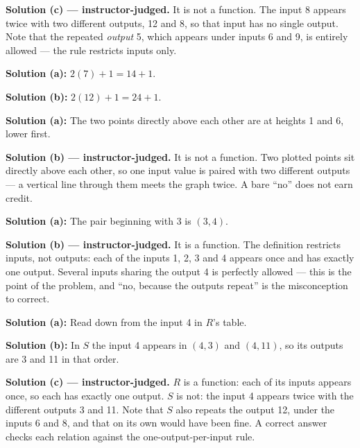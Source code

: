 \documentclass[12pt]{article}
\begin{document}
\textbf{Solution (c) --- instructor-judged.} It is not a function. The input 8
appears twice with two different outputs, 12 and 8, so that input has no
single output. Note that the repeated \emph{output} 5, which appears under
inputs 6 and 9, is entirely allowed --- the rule restricts inputs only.


\textbf{Solution (a):} $2(7) + 1 = 14 + 1$. 

\textbf{Solution (b):} $2(12) + 1 = 24 + 1$. 


\textbf{Solution (a):} The two points directly above each other are at
heights 1 and 6, lower first. 

\textbf{Solution (b) --- instructor-judged.} It is not a function. Two plotted
points sit directly above each other, so one input value is paired with two
different outputs --- a vertical line through them meets the graph twice. A
bare ``no'' does not earn credit.


\textbf{Solution (a):} The pair beginning with 3 is $(3, 4)$. 

\textbf{Solution (b) --- instructor-judged.} It is a function. The definition
restricts inputs, not outputs: each of the inputs 1, 2, 3 and 4 appears once
and has exactly one output. Several inputs sharing the output 4 is perfectly
allowed --- this is the point of the problem, and ``no, because the outputs
repeat'' is the misconception to correct.


\textbf{Solution (a):} Read down from the input 4 in $R$'s table. 

\textbf{Solution (b):} In $S$ the input 4 appears in $(4, 3)$ and $(4, 11)$,
so its outputs are 3 and 11 in that order. 

\textbf{Solution (c) --- instructor-judged.} $R$ is a function: each of its
inputs appears once, so each has exactly one output. $S$ is not: the input 4
appears twice with the different outputs 3 and 11. Note that $S$ also repeats
the output 12, under the inputs 6 and 8, and that on its own would have been
fine. A correct answer checks each relation against the one-output-per-input
rule.
\end{document}
